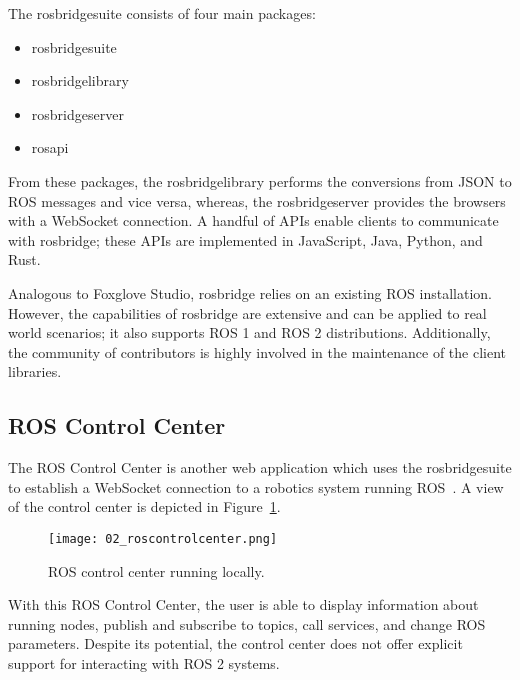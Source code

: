         The \textsf{rosbridge\smallunderscore  suite} consists of four main packages:

        \begin{itemize}
            \item \textsf{rosbridge\smallunderscore  suite}
            \item \textsf{rosbridge\smallunderscore  library}
            \item \textsf{rosbridge\smallunderscore  server}
            \item \textsf{rosapi}
        \end{itemize}

        From these packages, the \textsf{rosbridge\smallunderscore  library} performs the conversions from \ac{JSON} to \ac{ROS} messages and vice versa, whereas, the \textsf{rosbridge\smallunderscore  server} provides the browsers with a WebSocket connection. A handful of \ac{API}s enable clients to communicate with \textsf{rosbridge}; these \ac{API}s are implemented in JavaScript, Java, Python, and Rust.

        Analogous to Foxglove Studio, \textsf{rosbridge} relies on an existing ROS installation. However, the capabilities of \textsf{rosbridge} are extensive and can be applied to real world scenarios; it also supports \ac{ROS} 1 and \ac{ROS} 2 distributions. Additionally, the community of contributors is highly involved in the maintenance of the client libraries.

    \subsection{ROS Control Center}\label{sec:roscontrolcenter}

        The \ac{ROS} Control Center is another web application which uses the \textsf{rosbridge\smallunderscore  suite} to establish a WebSocket connection to a robotics system running \ac{ROS}~\cite{controlcenter}. A view of the control center is depicted in Figure~\ref{fig:roscontrolcenter}.

        \begin{figure}[htbp]
            \centering
            \texttt{[image: 02\_roscontrolcenter.png]}
            \caption{ROS control center running locally.}
            \label{fig:roscontrolcenter}
        \end{figure}

        With this \ac{ROS} Control Center, the user is able to display information about running nodes, publish and subscribe to topics, call services, and change \ac{ROS} parameters. Despite its potential, the control center does not offer explicit support for interacting with \ac{ROS} 2 systems.

